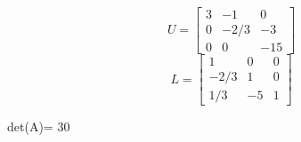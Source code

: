 
\bigskip
\[
U=\left[
\begin{array}{ccc}
3 & -1 & 0 \\
0 & -2/3 & -3\\
0 & 0 & -15
\end{array}\right]
\]
\bigskip
\[
L=\left[
\begin{array}{ccc}
1 & 0 & 0 \\
-2/3 & 1 & 0\\
1/3 & -5 & 1
\end{array}\right]
\]


det(A)= 30
